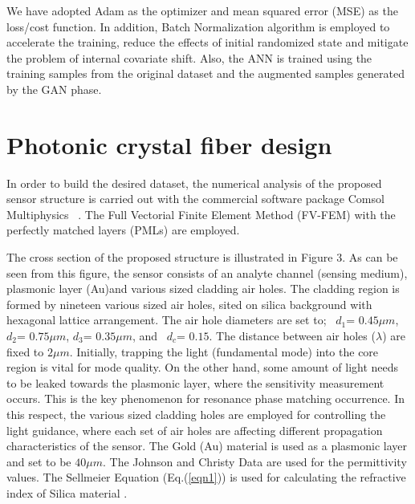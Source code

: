 \documentclass[journal]{IEEEtran}
\begin{document}
We have adopted Adam \cite{kingma2014adam}as the optimizer and mean squared error (MSE) as the loss/cost function. In addition, Batch Normalization algorithm \cite{ioffe2015batch} is employed to accelerate the training, reduce the effects of initial randomized state and mitigate the problem of internal covariate shift. Also, the ANN is trained using the training samples from the original dataset and the augmented samples generated by the GAN phase.

\section{Photonic crystal fiber design}
\label{sec:pcf}

In order to build the desired dataset, the numerical analysis of the proposed sensor structure is carried out with the commercial software package Comsol Multiphysics  \cite{comsol_help}. The Full Vectorial Finite Element Method (FV-FEM) with the perfectly matched layers (PMLs) \cite{koshiba2002full,saitoh2001full} are employed.

The cross section of the proposed structure is illustrated in Figure 3. As can be seen from this figure, the sensor consists of an analyte channel (sensing medium), plasmonic layer (Au)and various sized cladding air holes. The cladding region is formed by nineteen various sized air holes, sited on silica background with hexagonal lattice arrangement. The air hole diameters are set to;  $d_1$= $0.45 \mu m$, $d_2$= $0.75 \mu m$, $d_3$= $0.35 \mu m$, and  $d_c$= $0.15$. The distance between air holes ($\lambda$) are fixed to $2 \mu m$. Initially, trapping the light (fundamental mode) into the core region is vital for mode quality. On the other hand, some amount of light needs to be leaked towards the plasmonic layer, where the sensitivity measurement occurs. This is the key phenomenon for resonance phase matching occurrence. In this respect, the various sized cladding holes are employed for controlling the light guidance, where each set of air holes are affecting different propagation characteristics of the sensor. The Gold (Au) material is used as a plasmonic layer and set to be $40 \mu m$. The Johnson and Christy Data \cite{johnson1972optical} are used for the permittivity values. The Sellmeier Equation (Eq.(\ref{eqn1})) is used for calculating the refractive index of Silica material \cite{bjarklev2003PCF}.
\end{document}
